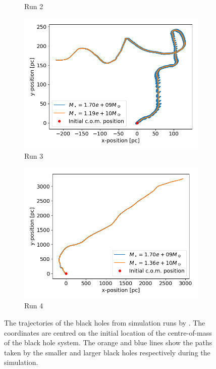 \documentclass[english, oneside]{HYgradu}
\begin{document}
\begin{figure}
\begin{subfigure}[b]{0.49\textwidth}
		\caption{Run 2}
	\end{subfigure}
	\begin{subfigure}[b]{0.49\textwidth}
		\includegraphics[width=\textwidth]{Run3_Trajectory_small.png}
		\caption{Run 3}
	\end{subfigure}
	\begin{subfigure}[b]{0.49\textwidth}
		\includegraphics[width=\textwidth]{Run4_Trajectory_small.png}
		\caption{Run 4}
	\end{subfigure}
	\caption{The trajectories of the black holes from simulation runs by \cite{Mannerkoski2019}. The coordinates are centred on the initial location of the centre-of-mass of the black hole system. The orange and blue lines show the paths taken by the smaller and larger black holes respectively during the simulation.}
	\label{figure:all_traj}
\end{figure}
\end{document}
